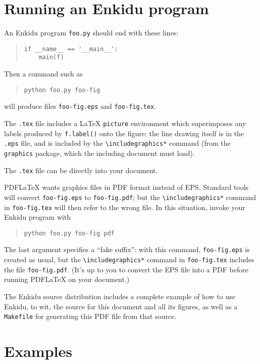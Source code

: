 \documentclass{enkidudoc}
\begin{document}
\pagebreak
\section{Running an Enkidu program}

An Enkidu program \texttt{foo.py} should end with these lines:
\begin{quote}{\small\begin{verbatim}
if __name__ == '__main__':
    main(f)
\end{verbatim}}\end{quote}
Then a command such as
\begin{quote}{\small\verb:python foo.py foo-fig:}\end{quote}
will produce files \texttt{foo-fig.eps} and \texttt{foo-fig.tex}.

The \texttt{.tex} file includes a \LaTeX{} \texttt{picture} environment
which superimposes any labels produced by \texttt{f.label()} onto the figure;
the line drawing itself is in the \texttt{.eps} file, and is included by
the \verb:\includegraphics*: command
(from the \texttt{graphics} package,
which the including document must load).

The \texttt{.tex} file can be \verb:: directly into your document.

PDF\LaTeX{} wants graphics files in PDF format instead of EPS.
Standard tools will convert \texttt{foo-fig.eps} to \texttt{foo-fig.pdf};
but the \verb:\includegraphics*: command in \texttt{foo-fig.tex}
will then refer to the wrong file.
In this situation, invoke your Enkidu program with
\begin{quote}{\small\verb:python foo.py foo-fig pdf:}\end{quote}
The last argument specifies a ``fake suffix'':
with this command, \texttt{foo-fig.eps} is created as usual,
but the \verb:\includegraphics*: command in \texttt{foo-fig.tex}
includes the file \texttt{foo-fig.pdf}.
(It's up to you to convert the EPS file into a PDF
before running PDF\LaTeX{} on your document.)

The Enkidu source distribution includes a complete example
of how to use Enkidu,
to wit, the source for this document and all its figures,
as well as a \texttt{Makefile} for generating this PDF file from that source.

\pagebreak
\section{Examples}
\end{document}
